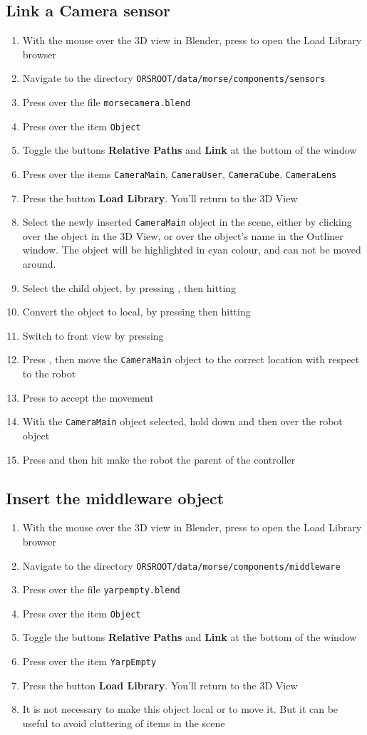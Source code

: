 \documentclass[twoside,a4paper,10pt]{report}
\newcommand{\dokutitleleveltree}[1]{\subsection{#1}}
\newcommand{\dokubold}[1]{\textbf{#1}}
\newcommand{\dokumonospace}[1]{\texttt{#1}}
\newcommand{\dokuitem}{\item}
\begin{document}
\dokutitleleveltree{Link a Camera sensor}
\label{2e2e4de5af03ad71dd248a06e314e9d7}%

\begin{enumerate}\dokuitem  With the mouse over the 3D view in Blender, press  to open the Load Library browser
\dokuitem  Navigate to the directory \dokumonospace{{\textdollar}ORS{\textunderscore}ROOT/data/morse/components/sensors}
\dokuitem  Press  over the file \dokumonospace{morse{\textunderscore}camera.blend}
\dokuitem  Press  over the item \dokumonospace{Object}
\dokuitem  Toggle the buttons \dokubold{Relative Paths} and \dokubold{Link} at the bottom of the window
\dokuitem  Press  over the items \dokumonospace{CameraMain}, \dokumonospace{CameraUser}, \dokumonospace{CameraCube}, \dokumonospace{CameraLens}
\dokuitem  Press the button \dokubold{Load Library}. You'll return to the 3D View
\dokuitem  Select the newly inserted \dokumonospace{CameraMain} object in the scene, either by  clicking over the object in the 3D View, or  over the object's name in the Outliner window. The object will be highlighted in cyan colour, and can not be moved around.
\dokuitem  Select the child object, by pressing , then hitting 
\dokuitem  Convert the object to local, by pressing  then hitting 
\dokuitem  Switch to front view by pressing 
\dokuitem  Press , then move the \dokumonospace{CameraMain} object to the correct location with respect to the robot
\dokuitem  Press  to accept the movement
\dokuitem  With the \dokumonospace{CameraMain} object selected, hold down  and then  over the robot object
\dokuitem  Press  and then hit  make the robot the parent of the controller
\end{enumerate}

\dokutitleleveltree{Insert the middleware object}
\label{fc2213e90f6f9853c66c14f9f79c3379}%

\begin{enumerate}\dokuitem  With the mouse over the 3D view in Blender, press  to open the Load Library browser
\dokuitem  Navigate to the directory \dokumonospace{{\textdollar}ORS{\textunderscore}ROOT/data/morse/components/middleware}
\dokuitem  Press  over the file \dokumonospace{yarp{\textunderscore}empty.blend}
\dokuitem  Press  over the item \dokumonospace{Object}
\dokuitem  Toggle the buttons \dokubold{Relative Paths} and \dokubold{Link} at the bottom of the window
\dokuitem  Press  over the item \dokumonospace{Yarp{\textunderscore}Empty}
\dokuitem  Press the button \dokubold{Load Library}. You'll return to the 3D View
\dokuitem  It is not necessary to make this object local or to move it. But it can be useful to avoid cluttering of items in the scene 
\end{enumerate}
\end{document}
